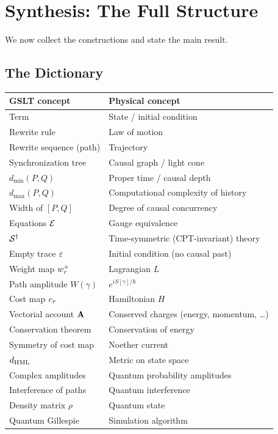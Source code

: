 \chapter{Synthesis: The Full Structure}
\label{sec:synthesis}

We now collect the constructions and state the main result.

\section{The Dictionary}

\begin{center}
\renewcommand{\arraystretch}{1.3}
\begin{tabular}{ll}
\toprule
\textbf{GSLT concept} & \textbf{Physical concept} \\
\midrule
Term & State / initial condition \\
Rewrite rule & Law of motion \\
Rewrite sequence (path) & Trajectory \\
Synchronization tree & Causal graph / light cone \\
$d_{\min}(P,Q)$ & Proper time / causal depth \\
$d_{\max}(P,Q)$ & Computational complexity of history \\
Width of $[P,Q]$ & Degree of causal concurrency \\
Equations $\mathcal{E}$ & Gauge equivalence \\
$\mathcal{S}^\dagger$ & Time-symmetric (CPT-invariant) theory \\
Empty trace $\varepsilon$ & Initial condition (no causal past) \\
Weight map $w^{+}_r$ & Lagrangian $L$ \\
Path amplitude $W(\gamma)$ & $e^{iS[\gamma]/\hbar}$ \\
Cost map $c_r$ & Hamiltonian $H$ \\
Vectorial account $\mathbf{A}$ & Conserved charges (energy, momentum, \ldots) \\
Conservation theorem & Conservation of energy \\
Symmetry of cost map & Noether current \\
$d_{\mathrm{HML}}$ & Metric on state space \\
Complex amplitudes & Quantum probability amplitudes \\
Interference of paths & Quantum interference \\
Density matrix $\rho$ & Quantum state \\
Quantum Gillespie & Simulation algorithm \\
\bottomrule
\end{tabular}
\end{center}

